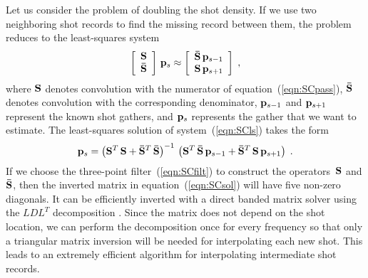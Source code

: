   Let us consider the problem of doubling the shot density.  If we use
  two neighboring shot records to find the missing record between
  them, the problem reduces to the least-squares system
  \begin{equation}
    \label{eqn:SCls}
    \left[\begin{array}{c}
        \bold{S} \\
        \bold{\bar{S}}
      \end{array}\right]\,\bold{p}_s \approx
    \left[\begin{array}{c}
        \bold{\bar{S}}\,\bold{p}_{s-1} \\
        \bold{S}\,\bold{p}_{s+1}
      \end{array}\right]\;,
  \end{equation}
  where $\bold{S}$ denotes convolution with the numerator of
  equation~(\ref{eqn:SCpass}), $\bold{\bar{S}}$ denotes convolution
  with the corresponding denominator, $\bold{p}_{s-1}$ and
  $\bold{p}_{s+1}$ represent the known shot gathers, and $\bold{p}_s$
  represents the gather that we want to estimate. The least-squares
  solution of system~(\ref{eqn:SCls}) takes the form
  \begin{equation}
    \label{eqn:SCsol}
    \bold{p}_s = \left(
      \bold{S}^T\,\bold{S} +
      \bold{\bar{S}}^T\,\bold{\bar{S}}
    \right)^{-1}\,
    \left(\bold{S}^T\,\bold{\bar{S}}\,\bold{p}_{s-1} +
      \bold{\bar{S}}^T\,\bold{S}\,\bold{p}_{s+1}\right)\;.
  \end{equation}
  If we choose the three-point filter~(\ref{eqn:SCfilt}) to construct
  the operators~$\bold{S}$ and $\bold{\bar{S}}$, then the inverted
  matrix in equation~(\ref{eqn:SCsol}) will have five non-zero
  diagonals. It can be efficiently inverted with a direct banded
  matrix solver using the $LDL^T$ decomposition \cite{golub}. Since
  the matrix does not depend on the shot location, we can perform the
  decomposition once for every frequency so that only a triangular
  matrix inversion will be needed for interpolating each new shot.
  This leads to an extremely efficient algorithm for interpolating
  intermediate shot records.

